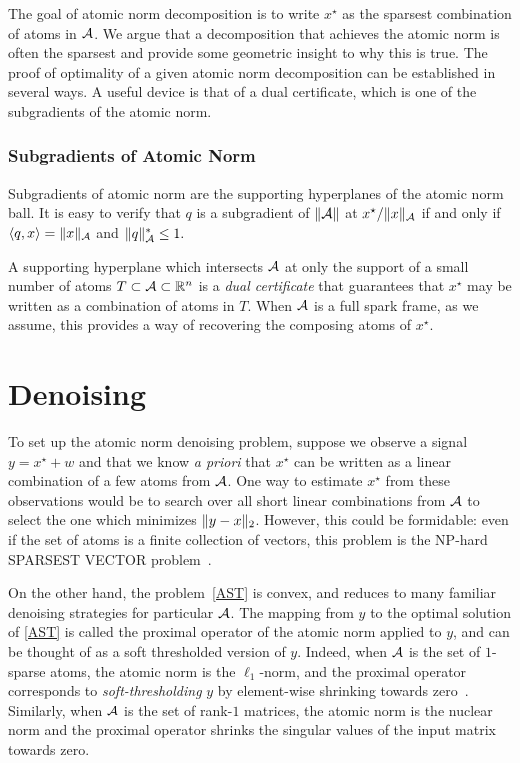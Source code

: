 The goal of atomic norm decomposition is to write $x^\star$ as the
sparsest combination of atoms in $\mathcal{A}$. We argue that a decomposition that
achieves the atomic norm is often the sparsest and provide some geometric
insight to why this is true. The proof of optimality of a given atomic norm
decomposition can be established in several ways. A useful device is that of 
a dual certificate, which is one of the subgradients of the atomic norm.

\subsubsection{Subgradients of Atomic Norm}

Subgradients of atomic norm are the supporting hyperplanes of the atomic norm
ball. It is easy to verify that $q$ is a subgradient of $\lVert\mathcal{A}\rVert$ at
$x^\star/\lVert x\rVert_{\mathcal{A}}$ if and only if $\langle q, x \rangle = \lVert x\rVert_{\mathcal{A}}$ and
$\lVert q\rVert_{\mathcal{A}}^* \leq 1.$

 A supporting hyperplane which intersects $\mathcal{A}$ at only the support of a small
number of atoms $T \subset \mathcal{A} \subset \mathbb{R}^n$ is a \emph{dual certificate} that
guarantees that $x^\star$ may be written as a combination of atoms in $T.$ When
$\mathcal{A}$ is a full spark frame, as we assume, this provides a way of recovering the
composing atoms of $x^\star$.

\section{Denoising}
\label{sec:abstract-denoising}

To set up the atomic norm denoising problem, suppose we observe a signal $y =
x^\star + w$ and that we know \emph{a priori} that $x^\star$ can be written as a
linear combination of a few atoms from $\mathcal{A}$. One way to estimate $x^\star$ from
these observations would be to search over all short linear combinations from
$\mathcal{A}$ to select the one which minimizes $\lVert y- x\rVert_2$. However, this could be
formidable: even if the set of atoms is a finite collection of vectors, this
problem is the NP-hard SPARSEST VECTOR problem~\cite{Natarajan95}.

On the other hand, the problem~\eqref{AST} is convex, and reduces to many
familiar denoising strategies for particular $\mathcal{A}$. The mapping from $y$ to the
optimal solution of \eqref{AST} is called the proximal operator of the atomic
norm applied to $y$, and can be thought of as a soft thresholded version of $y$.
Indeed, when $\mathcal{A}$ is the set of $1$-sparse atoms, the atomic norm is the
$\ell_1$-norm, and the proximal operator corresponds to \emph{soft-thresholding}
$y$ by element-wise shrinking towards zero~\cite{donoho1995noising}. Similarly,
when $\mathcal{A}$ is the set of rank-$1$ matrices, the atomic norm is the nuclear norm
and the proximal operator shrinks the singular values of the input matrix
towards zero.

